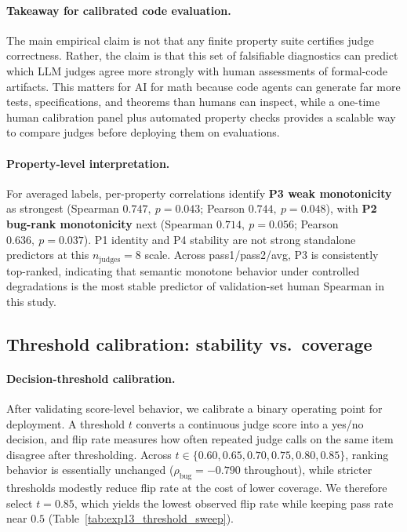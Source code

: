 \documentclass{article}
\begin{document}
\paragraph{Takeaway for calibrated code evaluation.}
The main empirical claim is not that any finite property suite certifies judge correctness. Rather, the claim is that this set of falsifiable diagnostics can predict which LLM judges agree more strongly with human assessments of formal-code artifacts. This matters for AI for math because code agents can generate far more tests, specifications, and theorems than humans can inspect, while a one-time human calibration panel plus automated property checks provides a scalable way to compare judges before deploying them on evaluations.

\paragraph{Property-level interpretation.}
For averaged labels, per-property correlations identify
\textbf{P3 weak monotonicity} as strongest (Spearman \(0.747,\ p=0.043\); Pearson \(0.744,\ p=0.048\)),
with \textbf{P2 bug-rank monotonicity} next (Spearman \(0.714,\ p=0.056\); Pearson \(0.636,\ p=0.037\)).
P1 identity and P4 stability are not strong standalone predictors at this \(n_\text{judges}=8\) scale.
Across pass1/pass2/avg, P3 is consistently top-ranked, indicating that semantic monotone behavior under controlled degradations is the most stable predictor of validation-set human Spearman in this study.

\subsection{Threshold calibration: stability vs.\ coverage}
\paragraph{Decision-threshold calibration.}
After validating score-level behavior, we calibrate a binary operating point for deployment. A threshold \(t\) converts a continuous judge score into a yes/no decision, and flip rate measures how often repeated judge calls on the same item disagree after thresholding. Across \(t\in\{0.60,0.65,0.70,0.75,0.80,0.85\}\), ranking behavior is essentially unchanged (\(\rho_{\text{bug}}=-0.790\) throughout), while stricter thresholds modestly reduce flip rate at the cost of lower coverage. We therefore select \(t=0.85\), which yields the lowest observed flip rate while keeping pass rate near \(0.5\) (Table~\ref{tab:exp13_threshold_sweep}).
\end{document}
